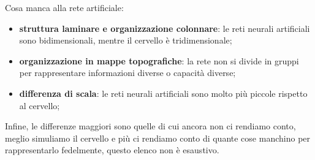 Cosa manca alla rete artificiale:
\begin{itemize}
	\item \textbf{struttura laminare e organizzazione colonnare}: le reti neurali artificiali
		sono bidimensionali, mentre il cervello è tridimensionale;

	\item \textbf{organizzazione in mappe topografiche}: la rete non si divide in gruppi per
		rappresentare informazioni diverse o capacità diverse;

	\item \textbf{differenza di scala}: le reti neurali artificiali sono molto più piccole
	rispetto al cervello;
\end{itemize}

Infine, le differenze maggiori sono quelle di cui ancora non ci rendiamo conto,
meglio simuliamo il cervello e più ci rendiamo conto di quante cose manchino per
rappresentarlo fedelmente, questo elenco non è esaustivo.
